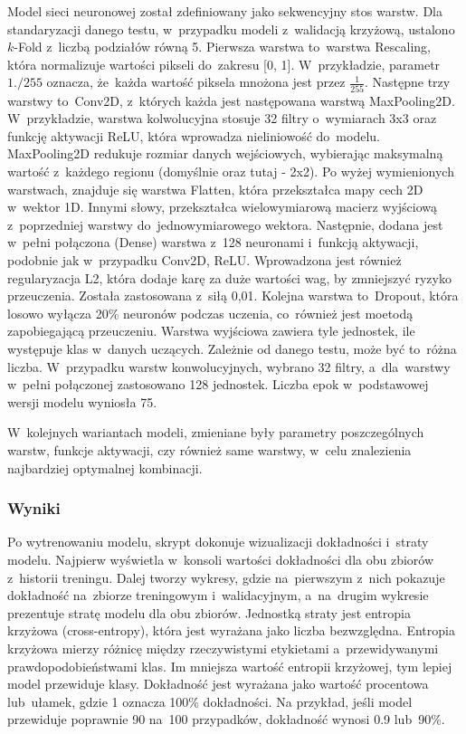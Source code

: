 Model sieci neuronowej został zdefiniowany jako sekwencyjny stos warstw.
Dla standaryzacji danego testu, w~przypadku modeli z~walidacją krzyżową, ustalono $k$-Fold z~liczbą podziałów równą 5.
Pierwsza warstwa to~warstwa Rescaling, która normalizuje wartości pikseli do~zakresu [0, 1].
W~przykładzie, parametr $1./255$ oznacza, że~każda wartość piksela mnożona jest przez $\frac{1}{255}$.
Następne trzy warstwy to~Conv2D, z~których każda jest następowana warstwą MaxPooling2D.
W~przykładzie, warstwa kolwolucyjna stosuje 32 filtry o~wymiarach 3x3 oraz funkcję aktywacji ReLU,
która wprowadza nieliniowość do~modelu.
MaxPooling2D redukuje rozmiar danych wejściowych,
wybierając maksymalną wartość z~każdego regionu (domyślnie oraz tutaj - 2x2). 
Po wyżej wymienionych warstwach, znajduje się warstwa Flatten, która przekształca mapy cech 2D w~wektor 1D.
Innymi słowy, przekształca wielowymiarową macierz wyjściową z~poprzedniej warstwy do~jednowymiarowego wektora.
Następnie, dodana jest w~pełni połączona (Dense) warstwa z~128 neuronami
i~funkcją aktywacji, podobnie jak w~przypadku Conv2D, ReLU.
Wprowadzona jest również regularyzacja L2, która dodaje karę za duże wartości wag,
by zmniejszyć ryzyko przeuczenia. Została zastosowana z~siłą 0,01.
Kolejna warstwa to~Dropout, która losowo wyłącza 20\% neuronów podczas uczenia,
co~również jest moetodą zapobiegającą przeuczeniu.
Warstwa wyjściowa zawiera tyle jednostek, ile występuje klas w~danych uczących.
Zależnie od danego testu, może być to~różna liczba.
W~przypadku warstw konwolucyjnych, wybrano 32 filtry, a~dla~warstwy w~pełni połączonej zastosowano 128 jednostek.
Liczba epok w~podstawowej wersji modelu wyniosła 75.

W~kolejnych wariantach modeli, zmieniane były parametry poszczególnych warstw, funkcje aktywacji,
czy również same warstwy, w~celu znalezienia najbardziej optymalnej kombinacji.

\subsubsection{Wyniki}
Po wytrenowaniu modelu, skrypt dokonuje wizualizacji dokładności i~straty modelu.
Najpierw wyświetla w~konsoli wartości dokładności dla obu zbiorów z~historii treningu.
Dalej tworzy wykresy, gdzie na~pierwszym z~nich pokazuje dokładność na~zbiorze treningowym i~walidacyjnym,
a~na~drugim wykresie prezentuje stratę modelu dla obu zbiorów.
Jednostką straty jest entropia krzyżowa (cross-entropy), która jest wyrażana jako liczba bezwzględna.
Entropia krzyżowa mierzy różnicę między rzeczywistymi etykietami a~przewidywanymi prawdopodobieństwami klas.
Im mniejsza wartość entropii krzyżowej, tym lepiej model przewiduje klasy.
Dokładność jest wyrażana jako wartość procentowa lub~ułamek, gdzie 1 oznacza 100\% dokładności.
Na przykład, jeśli model przewiduje poprawnie 90 na~100 przypadków, dokładność wynosi 0.9 lub~90\%.

